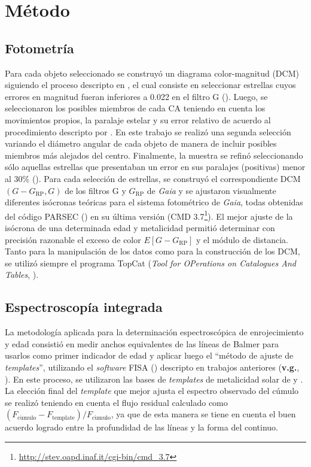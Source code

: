 \documentclass[baaa]{baaa}
\begin{document}
\section{M\'etodo}\label{s_3}
\subsection{Fotometr\'ia}
Para cada objeto seleccionado se construy\'o un diagrama color-magnitud (DCM) siguiendo el proceso descripto en \cite{B23}, el cual consiste en seleccionar estrellas cuyos errores en magnitud fueran inferiores a 0.022 en el filtro G (\citealt{G18}). Luego, se seleccionaron los posibles miembros de cada CA teniendo en cuenta los movimientos propios, la paralaje estelar y su error relativo de acuerdo al procedimiento descripto por \cite{P22}. En este trabajo se realiz\'o una segunda selecci\'on variando el di\'ametro angular de cada objeto de manera de incluir posibles miembros m\'as alejados del centro. Finalmente, la muestra se refin\'o seleccionando s\'olo aquellas estrellas que presentaban un error en sus paralajes (positivas) menor al 30$\%$ (\citealt{L18}). Para cada selecci\'on de estrellas, se construy\'o el correspondiente DCM $(G - G_\mathrm{RP},G)$ de los filtros G y $G_\mathrm{RP}$ de {\sl Gaia} y se ajustaron visualmente diferentes is\'ocronas te\'oricas para el sistema fotom\'etrico de {\sl Gaia}, todas obtenidas del c\'odigo {\sc PARSEC} (\citealt{Br12}) en su \'ultima versi\'on (CMD 3.7\footnote{\url{http://stev.oapd.inaf.it/cgi-bin/cmd_3.7}}). El mejor ajuste de la is\'ocrona de una determinada edad y metalicidad permiti\'o determinar con precisi\'on razonable el exceso de color $E[G - G_\mathrm{RP}]$ y el m\'odulo de distancia. Tanto para la manipulaci\'on de los datos como para la construcci\'on de los DCM, se utiliz\'o siempre el programa {\sc TopCat} ({\em Tool for OPerations on Catalogues And Tables}, \citealt{T17}).

\subsection{Espectroscop\'ia integrada}
La metodolog\'ia aplicada para la determinaci\'on espectrosc\'opica de enrojecimiento y edad consisti\'o en medir anchos equivalentes de las l\'ineas de Balmer para usarlos como primer indicador de edad y aplicar luego el “m\'etodo de ajuste de {\em templates}”, utilizando el {\em software} {\sc FISA} (\citealt{B12}) descripto en trabajos anteriores (\textrm{\textbf{v.g.}}, \citealt{C17}). En este proceso, se utilizaron las bases de {\em templates} de metalicidad solar de \cite{P02} y \cite{ACB07}. La elecci\'on final del {\em template} que mejor ajusta el espectro observado del c\'umulo se realiz\'o teniendo en cuenta el flujo residual calculado como $(F_\mathrm{c\acute{u}mulo} - F_\mathrm{template}) / F_\mathrm{c\acute{u}mulo}$, ya que de esta manera se tiene en cuenta el buen acuerdo logrado entre la profundidad de las líneas y la forma del continuo.
\end{document}
